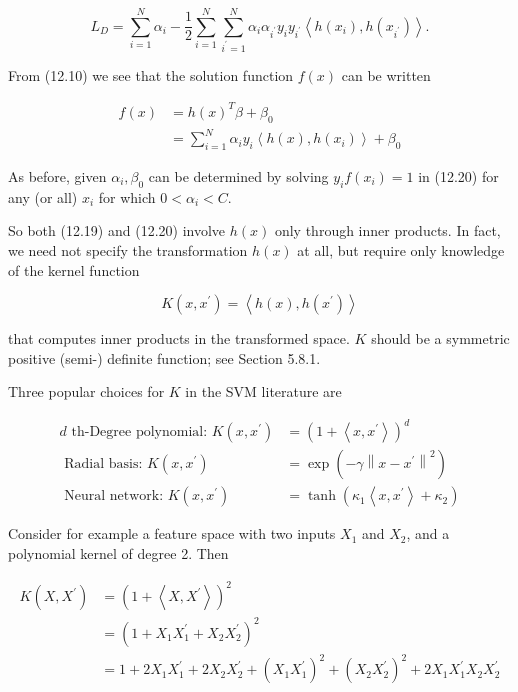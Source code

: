 \documentclass[10pt]{article}
\begin{document}
\begin{equation*}
L_{D}=\sum_{i=1}^{N} \alpha_{i}-\frac{1}{2} \sum_{i=1}^{N} \sum_{i^{\prime}=1}^{N} \alpha_{i} \alpha_{i^{\prime}} y_{i} y_{i^{\prime}}\left\langle h\left(x_{i}\right), h\left(x_{i^{\prime}}\right)\right\rangle . \tag{12.19}
\end{equation*}


From (12.10) we see that the solution function $f(x)$ can be written


\begin{align*}
f(x) & =h(x)^{T} \beta+\beta_{0} \\
& =\sum_{i=1}^{N} \alpha_{i} y_{i}\left\langle h(x), h\left(x_{i}\right)\right\rangle+\beta_{0} \tag{12.20}
\end{align*}


As before, given $\alpha_{i}, \beta_{0}$ can be determined by solving $y_{i} f\left(x_{i}\right)=1$ in (12.20) for any (or all) $x_{i}$ for which $0<\alpha_{i}<C$.

So both (12.19) and (12.20) involve $h(x)$ only through inner products. In fact, we need not specify the transformation $h(x)$ at all, but require only knowledge of the kernel function


\begin{equation*}
K\left(x, x^{\prime}\right)=\left\langle h(x), h\left(x^{\prime}\right)\right\rangle \tag{12.21}
\end{equation*}


that computes inner products in the transformed space. $K$ should be a symmetric positive (semi-) definite function; see Section 5.8.1.

Three popular choices for $K$ in the SVM literature are


\begin{align*}
d \text { th-Degree polynomial: } K\left(x, x^{\prime}\right) & =\left(1+\left\langle x, x^{\prime}\right\rangle\right)^{d} \\
\text { Radial basis: } K\left(x, x^{\prime}\right) & =\exp \left(-\gamma\left\|x-x^{\prime}\right\|^{2}\right)  \tag{12.22}\\
\text { Neural network: } K\left(x, x^{\prime}\right) & =\tanh \left(\kappa_{1}\left\langle x, x^{\prime}\right\rangle+\kappa_{2}\right)
\end{align*}


Consider for example a feature space with two inputs $X_{1}$ and $X_{2}$, and a polynomial kernel of degree 2. Then


\begin{align*}
K\left(X, X^{\prime}\right) & =\left(1+\left\langle X, X^{\prime}\right\rangle\right)^{2} \\
& =\left(1+X_{1} X_{1}^{\prime}+X_{2} X_{2}^{\prime}\right)^{2} \\
& =1+2 X_{1} X_{1}^{\prime}+2 X_{2} X_{2}^{\prime}+\left(X_{1} X_{1}^{\prime}\right)^{2}+\left(X_{2} X_{2}^{\prime}\right)^{2}+2 X_{1} X_{1}^{\prime} X_{2} X_{2}^{\prime} \tag{12.23}
\end{align*}
\end{document}
